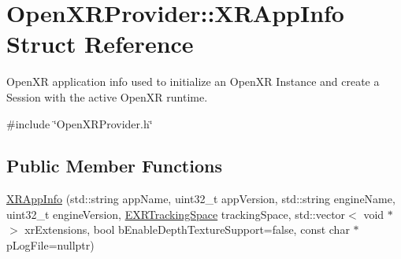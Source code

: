 \hypertarget{struct_open_x_r_provider_1_1_x_r_app_info}{}\section{Open\+X\+R\+Provider\+::X\+R\+App\+Info Struct Reference}
\label{struct_open_x_r_provider_1_1_x_r_app_info}


Open\+XR application info used to initialize an Open\+XR Instance and create a Session with the active Open\+XR runtime.  




{\ttfamily \#include \char`\"{}Open\+X\+R\+Provider.\+h\char`\"{}}

\subsection*{Public Member Functions}
\begin{DoxyCompactItemize}
\item 
\mbox{\hyperlink{struct_open_x_r_provider_1_1_x_r_app_info_a54ff47ab67f3c32aa6e2a8e48c8a982a}{X\+R\+App\+Info}} (std\+::string app\+Name, uint32\+\_\+t app\+Version, std\+::string engine\+Name, uint32\+\_\+t engine\+Version, \mbox{\hyperlink{namespace_open_x_r_provider_a005dd91723b05b123b8fccbc41798b05}{E\+X\+R\+Tracking\+Space}} tracking\+Space, std\+::vector$<$ void $\ast$ $>$ xr\+Extensions, bool b\+Enable\+Depth\+Texture\+Support=false, const char $\ast$p\+Log\+File=nullptr)
\end{DoxyCompactItemize}
